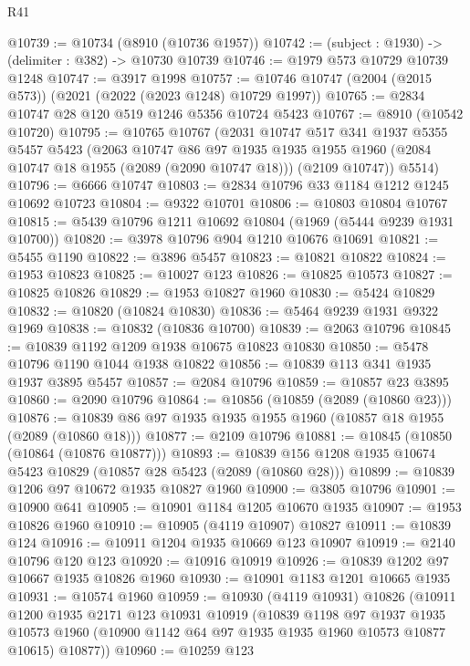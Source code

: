 \begin{lexlean}{R41}
\begin{coremodule}
@10739 := @10734 (@8910 (@10736 @1957))
@10742 := (subject : @1930) -> (delimiter : @382) -> @10730 @10739
@10746 := @1979 @573 @10729 @10739 @1248
@10747 := @3917 @1998
@10757 := @10746 @10747 (@2004 (@2015 @573)) (@2021 (@2022 (@2023 @1248) @10729 @1997))
@10765 := @2834 @10747 @28 @120 @519 @1246 @5356 @10724 @5423
@10767 := @8910 (@10542 @10720)
@10795 := @10765
    @10767
    (@2031
      @10747
      @517
      @341
      @1937
      @5355
      @5457
      @5423
      (@2063
        @10747
        @86
        @97
        @1935
        @1935
        @1955
        @1960
        (@2084 @10747 @18 @1955 (@2089 (@2090 @10747 @18)))
        (@2109 @10747))
      @5514)
@10796 := @6666 @10747
@10803 := @2834 @10796 @33 @1184 @1212 @1245 @10692 @10723
@10804 := @9322 @10701
@10806 := @10803 @10804 @10767
@10815 := @5439 @10796 @1211 @10692 @10804 (@1969 (@5444 @9239 @1931 @10700))
@10820 := @3978 @10796 @904 @1210 @10676 @10691
@10821 := @5455 @1190
@10822 := @3896 @5457
@10823 := @10821 @10822
@10824 := @1953 @10823
@10825 := @10027 @123
@10826 := @10825 @10573
@10827 := @10825 @10826
@10829 := @1953 @10827 @1960
@10830 := @5424 @10829
@10832 := @10820 (@10824 @10830)
@10836 := @5464 @9239 @1931 @9322 @1969
@10838 := @10832 (@10836 @10700)
@10839 := @2063 @10796
@10845 := @10839 @1192 @1209 @1938 @10675 @10823 @10830
@10850 := @5478 @10796 @1190 @1044 @1938 @10822
@10856 := @10839 @113 @341 @1935 @1937 @3895 @5457
@10857 := @2084 @10796
@10859 := @10857 @23 @3895
@10860 := @2090 @10796
@10864 := @10856 (@10859 (@2089 (@10860 @23)))
@10876 := @10839 @86 @97 @1935 @1935 @1955 @1960 (@10857 @18 @1955 (@2089 (@10860 @18)))
@10877 := @2109 @10796
@10881 := @10845 (@10850 (@10864 (@10876 @10877)))
@10893 := @10839 @156 @1208 @1935 @10674 @5423 @10829 (@10857 @28 @5423 (@2089 (@10860 @28)))
@10899 := @10839 @1206 @97 @10672 @1935 @10827 @1960
@10900 := @3805 @10796
@10901 := @10900 @641
@10905 := @10901 @1184 @1205 @10670 @1935
@10907 := @1953 @10826 @1960
@10910 := @10905 (@4119 @10907) @10827
@10911 := @10839 @124
@10916 := @10911 @1204 @1935 @10669 @123 @10907
@10919 := @2140 @10796 @120 @123
@10920 := @10916 @10919
@10926 := @10839 @1202 @97 @10667 @1935 @10826 @1960
@10930 := @10901 @1183 @1201 @10665 @1935
@10931 := @10574 @1960
@10959 := @10930
    (@4119 @10931)
    @10826
    (@10911
      @1200
      @1935
      @2171
      @123
      @10931
      @10919
      (@10839
        @1198
        @97
        @1937
        @1935
        @10573
        @1960
        (@10900 @1142 @64 @97 @1935 @1935 @1960 @10573 @10877 @10615)
        @10877))
@10960 := @10259 @123

\end{coremodule}
\end{lexlean}
